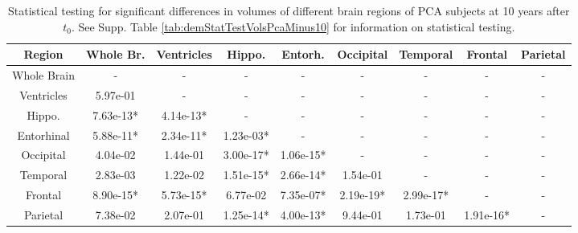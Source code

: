 \begin{table}
\centering
\begin{tabular}{c |c c c c c c c c }
Region & Whole Br. & Ventricles & Hippo. & Entorh. & Occipital & Temporal & Frontal & Parietal\\
\hline 
Whole Brain & - & - & - & - & - & - & - & -\\
Ventricles & 5.97e-01 & - & - & - & - & - & - & -\\
Hippo. & 7.63e-13* & 4.14e-13* & - & - & - & - & - & -\\
Entorhinal & 5.88e-11* & 2.34e-11* & 1.23e-03* & - & - & - & - & -\\
Occipital & 4.04e-02 & 1.44e-01 & 3.00e-17* & 1.06e-15* & - & - & - & -\\
Temporal & 2.83e-03 & 1.22e-02 & 1.51e-15* & 2.66e-14* & 1.54e-01 & - & - & -\\
Frontal & 8.90e-15* & 5.73e-15* & 6.77e-02 & 7.35e-07* & 2.19e-19* & 2.99e-17* & - & -\\
Parietal & 7.38e-02 & 2.07e-01 & 1.25e-14* & 4.00e-13* & 9.44e-01 & 1.73e-01 & 1.91e-16* & -\\


\end{tabular} 
\caption[Statistical testing for significant differences in volumes of different brain regions of PCA subjects at 10 years after $t_0$.]{Statistical testing for significant differences in volumes of different brain regions of PCA subjects at 10 years after $t_0$. See Supp. Table \ref{tab:demStatTestVolsPcaMinus10} for information on statistical testing.} 
\label{tab:demStatTestVolsPcaPlus10}
\end{table}



